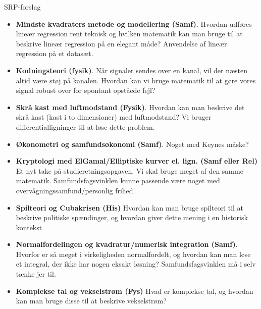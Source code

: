 \documentclass[12pt]{article}
\begin{document}



\begin{center}
	\Huge
	SRP-forslag
\end{center}
\def\labelitemi{$\cdot$}
\begin{itemize}
	\item \textbf{Mindste kvadraters metode og modellering (Samf)}.
	Hvordan udføres lineær regression rent teknisk og hvilken matematik kan man bruge til at 
	beskrive lineær regression på en elegant måde? Anvendelse af lineær regression på et 
	datasæt.
	\item \textbf{Kodningsteori (fysik)}.
	Når signaler sendes over en kanal, vil der næsten altid være støj på kanalen. Hvordan kan 
	vi bruge matematik til at gøre vores signal robust over for spontant opståede fejl?
	\item \textbf{Skrå kast med luftmodstand (Fysik)}.
	Hvordan kan man beskrive det skrå kast (kast i to dimensioner) med luftmodstand? Vi bruger 
	differentialligninger til at løse dette problem.
	\item \textbf{Økonometri og samfundsøkonomi (Samf)}.
	Noget med Keynes måske?
	\item \textbf{Kryptologi med ElGamal/Elliptiske kurver el. lign. (Samf eller Rel)}
	Et nyt take på studieretningsopgaven. Vi skal bruge meget af den samme matematik. 
	Samfundsfagsvinklen kunne passende være noget med overvågningssamfund/personlig frihed.
	\item \textbf{Spilteori og Cubakrisen (His)}
	Hvordan kan man bruge spilteori til at beskrive politiske spændinger, og hvordan giver 
	dette mening i en historisk kontekst
	\item \textbf{Normalfordelingen og kvadratur/numerisk integration (Samf)}.
	Hvorfor er så meget i virkeligheden normalfordelt, og hvordan kan man løse et integral, 
	der ikke har nogen eksakt løsning? Samfundsfagsvinklen må i selv tænke jer til.
	\item \textbf{Komplekse tal og vekselstrøm (Fys)}
	Hvad er komplekse tal, og hvordan kan man bruge disse til at beskrive vekselstrøm?

\end{itemize}
\end{document}
